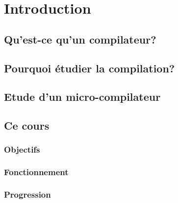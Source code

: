 \documentclass{book}
\begin{document}
\chapter{Introduction}

\section{Qu'est-ce qu'un compilateur?}

\section{Pourquoi étudier la compilation?}

\section{Etude d'un micro-compilateur}

\section{Ce cours}

\subsection{Objectifs}

\subsection{Fonctionnement}

\subsection{Progression}
\end{document}
